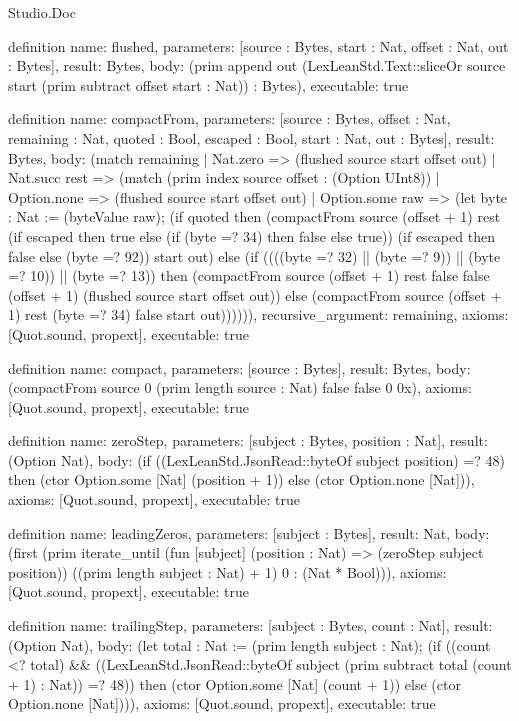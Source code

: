 \begin{lexlean}{Studio.Doc}
\begin{semanticmodule}
definition{
  name: flushed,
  parameters: [source : Bytes, start : Nat, offset : Nat, out : Bytes],
  result: Bytes,
  body: (prim append out (LexLeanStd.Text::sliceOr source start (prim subtract offset start : Nat)) : Bytes),
  executable: true
}

definition{
  name: compactFrom,
  parameters: [source : Bytes, offset : Nat, remaining : Nat, quoted : Bool, escaped : Bool, start : Nat, out : Bytes],
  result: Bytes,
  body: (match remaining
    | Nat.zero => (flushed source start offset out)
    | Nat.succ rest => (match (prim index source offset : (Option UInt8))
      | Option.none => (flushed source start offset out)
      | Option.some raw => (let byte : Nat := (byteValue raw); (if quoted then (compactFrom source (offset + 1) rest (if escaped then true else (if (byte =? 34) then false else true)) (if escaped then false else (byte =? 92)) start out) else (if ((((byte =? 32) || (byte =? 9)) || (byte =? 10)) || (byte =? 13)) then (compactFrom source (offset + 1) rest false false (offset + 1) (flushed source start offset out)) else (compactFrom source (offset + 1) rest (byte =? 34) false start out)))))),
  recursive_argument: remaining,
  axioms: [Quot.sound, propext],
  executable: true
}

definition{
  name: compact,
  parameters: [source : Bytes],
  result: Bytes,
  body: (compactFrom source 0 (prim length source : Nat) false false 0 0x),
  axioms: [Quot.sound, propext],
  executable: true
}

definition{
  name: zeroStep,
  parameters: [subject : Bytes, position : Nat],
  result: (Option Nat),
  body: (if ((LexLeanStd.JsonRead::byteOf subject position) =? 48) then (ctor Option.some [Nat] (position + 1)) else (ctor Option.none [Nat])),
  axioms: [Quot.sound, propext],
  executable: true
}

definition{
  name: leadingZeros,
  parameters: [subject : Bytes],
  result: Nat,
  body: (first (prim iterate_until (fun [subject] (position : Nat) => (zeroStep subject position)) ((prim length subject : Nat) + 1) 0 : (Nat * Bool))),
  axioms: [Quot.sound, propext],
  executable: true
}

definition{
  name: trailingStep,
  parameters: [subject : Bytes, count : Nat],
  result: (Option Nat),
  body: (let total : Nat := (prim length subject : Nat); (if ((count <? total) && ((LexLeanStd.JsonRead::byteOf subject (prim subtract total (count + 1) : Nat)) =? 48)) then (ctor Option.some [Nat] (count + 1)) else (ctor Option.none [Nat]))),
  axioms: [Quot.sound, propext],
  executable: true
}


\end{semanticmodule}
\end{lexlean}
